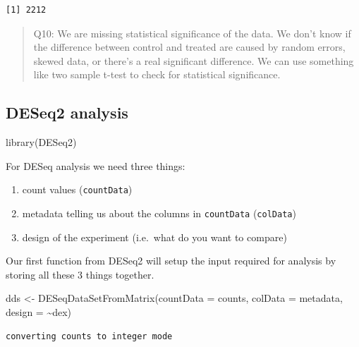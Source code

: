 \documentclass[
  letterpaper,
  DIV=11,
  numbers=noendperiod]{scrartcl}
\newenvironment{Shaded}{\begin{snugshade}}{\end{snugshade}}
\newcommand{\AttributeTok}[1]{\textcolor[rgb]{0.40,0.45,0.13}{#1}}
\newcommand{\FunctionTok}[1]{\textcolor[rgb]{0.28,0.35,0.67}{#1}}
\newcommand{\NormalTok}[1]{\textcolor[rgb]{0.00,0.23,0.31}{#1}}
\newcommand{\OtherTok}[1]{\textcolor[rgb]{0.00,0.23,0.31}{#1}}
\newcommand{\SpecialCharTok}[1]{\textcolor[rgb]{0.37,0.37,0.37}{#1}}
\providecommand{\tightlist}{%
  \setlength{\itemsep}{0pt}\setlength{\parskip}{0pt}}
\begin{document}
\begin{verbatim}
[1] 2212
\end{verbatim}

\begin{quote}
Q10: We are missing statistical significance of the data. We don't know
if the difference between control and treated are caused by random
errors, skewed data, or there's a real significant difference. We can
use something like two sample t-test to check for statistical
significance.
\end{quote}

\subsection{DESeq2 analysis}\label{deseq2-analysis}

\begin{Shaded}
\begin{Highlighting}[]
\FunctionTok{library}\NormalTok{(DESeq2)}
\end{Highlighting}
\end{Shaded}

For DESeq analysis we need three things:

\begin{enumerate}
\def\labelenumi{\arabic{enumi}.}
\tightlist
\item
  count values (\texttt{countData})
\item
  metadata telling us about the columns in \texttt{countData}
  (\texttt{colData})
\item
  design of the experiment (i.e.~what do you want to compare)
\end{enumerate}

Our first function from DESeq2 will setup the input required for
analysis by storing all these 3 things together.

\begin{Shaded}
\begin{Highlighting}[]
\NormalTok{dds }\OtherTok{\textless{}{-}} \FunctionTok{DESeqDataSetFromMatrix}\NormalTok{(}\AttributeTok{countData =}\NormalTok{ counts, }\AttributeTok{colData =}\NormalTok{ metadata, }\AttributeTok{design =} \SpecialCharTok{\textasciitilde{}}\NormalTok{dex)}
\end{Highlighting}
\end{Shaded}

\begin{verbatim}
converting counts to integer mode
\end{verbatim}
\end{document}
